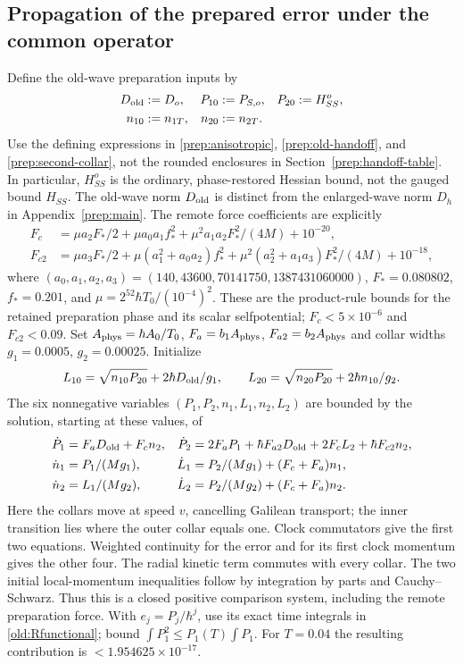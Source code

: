 \documentclass[11pt]{article}
\theoremstyle{definition}\newtheorem{definition}[theorem]{Definition}
\theoremstyle{remark}\newtheorem{remark}[theorem]{Remark}
\begin{document}
\subsection{Propagation of the prepared error under the common operator}
\label{old:homogeneous}
Define the old-wave preparation inputs by
\[
 \begin{aligned}
 D_{\rm old}&:=D_o,& P_{10}&:=P_{S,o},& P_{20}&:=H_{SS}^{o},\\
 n_{10}&:=n_{1T},& n_{20}&:=n_{2T}.
 \end{aligned}
\]
Use the defining expressions in \eqref{prep:anisotropic},
\eqref{prep:old-handoff}, and \eqref{prep:second-collar}, not the rounded
enclosures in Section~\ref{prep:handoff-table}. In particular,
$H_{SS}^{o}$ is the ordinary, phase-restored Hessian bound, not the
gauged bound $H_{SS}$. The old-wave norm $D_{\rm old}$ is distinct from
the enlarged-wave norm $D_h$ in Appendix~\ref{prep:main}.
The remote force coefficients are explicitly
\begin{align*}
 F_c&=\mu a_2F_*/2+\mu a_0a_1f_*^2
                     +\mu^2a_1a_2F_*^2/(4M)+10^{-20},\\
 F_{c2}&=\mu a_3F_*/2+\mu(a_1^2+a_0a_2)f_*^2
             +\mu^2(a_2^2+a_1a_3)F_*^2/(4M)+10^{-18},
\end{align*}
where
$(a_0,a_1,a_2,a_3)=(140,43600,70141750,1387431060000)$,
$F_*=0.080802$, $f_*=0.201$, and
$\mu=2^{52}\hbar T_0/(10^{-4})^2$.
These are the product-rule bounds for the retained preparation phase
and its scalar selfpotential; $F_c<5\times10^{-6}$ and $F_{c2}<0.09$.
Set $A_{\rm phys}=\hbar A_0/T_0$, $F_a=b_1A_{\rm phys}$,
$F_{a2}=b_2A_{\rm phys}$ and collar widths $g_1=0.0005$, $g_2=0.00025$.
Initialize
\[
 L_{10}=\sqrt{n_{10}P_{20}}+2\hbar D_{\rm old}/g_1,\qquad
 L_{20}=\sqrt{n_{20}P_{20}}+2\hbar n_{10}/g_2.
\]
The six nonnegative variables $(P_1,P_2,n_1,L_1,n_2,L_2)$ are bounded
by the solution, starting at these values, of
\begin{align*}
 \dot P_1&=F_aD_{\rm old}+F_cn_2,&
 \dot P_2&=2F_aP_1+\hbar F_{a2}D_{\rm old}+2F_cL_2+\hbar F_{c2}n_2,\\
 \dot n_1&=P_1/(Mg_1),&
 \dot L_1&=P_2/(Mg_1)+(F_c+F_a)n_1,\\
 \dot n_2&=L_1/(Mg_2),&
 \dot L_2&=P_2/(Mg_2)+(F_c+F_a)n_2.
\end{align*}
Here the collars move at speed $v$, cancelling Galilean transport;
the inner transition lies where the outer collar equals one.
Clock commutators give the first two equations. Weighted continuity for
the error and for its first clock momentum gives the other four.
The radial kinetic term commutes with every collar. The two initial
local-momentum inequalities follow by integration by parts and
Cauchy--Schwarz. Thus this is a closed positive comparison system,
including the remote preparation force.
With $e_j=P_j/\hbar^j$, use its exact time integrals in
\eqref{old:Rfunctional}; bound $\int P_1^2\leq P_1(T)\int P_1$.
For $T=0.04$ the resulting contribution is
$<1.954625\times10^{-17}$.
\end{document}
